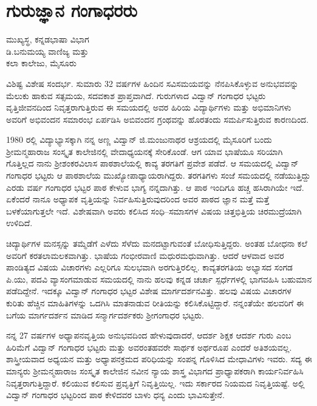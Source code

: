 {\fontsize{14}{16}\selectfont
\chapter{ಗುರುಜ್ಞಾನ ಗಂಗಾಧರರು}

\begin{center}
\smallskip
 ಮುಖ್ಯಸ್ಥ, ಕನ್ನಡಭಾಷಾ ವಿಭಾಗ\\
ಡಿ.ಬನುಮಯ್ಯ ವಾಣಿಜ್ಯ ಮತ್ತು \\
ಕಲಾ ಕಾಲೇಜು, ಮೈಸೂರು
\addrule
\end{center}

ವಿಶಿಷ್ಟ ವಿಶೇಷ ಸಂದರ್ಭ. ಸುಮಾರು 32 ವರ್ಷಗಳ ಹಿಂದಿನ ಸವಿಸಮಯವನ್ನು ನೆನಪಿಸಿಕೊಳ್ಳುವ ಅನುಭವವನ್ನು ಮೆಲುಕು ಹಾಕುವ ಸತ್ಸಮಯ, ಸದವಕಾಶ ಪ್ರಾಪ್ತವಾಗಿದೆ. ಗುರುಗಳಾದ ವಿದ್ವಾನ್ ಗಂಗಾಧರ ಭಟ್ಟರು ವೃತ್ತಿಜೀವನದಿಂದ ನಿವೃತ್ತರಾಗುತ್ತಿರುವ ಈ ಸಮಯದಲ್ಲಿ ಅವರ ಹಿರಿಯ ವಿದ್ಯಾರ್ಥಿಗಳು ಮತ್ತು ಅಭಿಮಾನಿಗಳು ಅವರಿಗೆ ಅಭಿವಂದನ ಸಮಾರಂಭ ಏರ್ಪಡಿಸಿ ಅಬಿವಂದನ ಗ್ರಂಥವನ್ನು ಹೊರತಂದು ಸಮರ್ಪಿಸುತ್ತಿರುವ ಕಾರಣದಿಂದ.

1980 ರಲ್ಲಿ ವಿದ್ಯಾಭ್ಯಾಸಕ್ಕಾಗಿ ನನ್ನ ಅಣ್ಣ ವಿದ್ವಾನ್ ಜಿ.ಮಂಜುನಾಥರ ಆಶ್ರಯದಲ್ಲಿ ಮೈಸೂರಿಗೆ ಬಂದು ಶ್ರೀಮನ್ಮಹಾರಾಜ ಸಂಸ್ಕೃತ ಕಾಲೇಜಿನಲ್ಲಿ ವೇದಾಧ್ಯಯನಕ್ಕೆ ಸೇರಿಕೊಂಡೆ. ಆಗ ಯಾವ ಭಾಷೆಯೂ ಸರಿಯಾಗಿ ಗೊತ್ತಿಲ್ಲದ ನಾನು ಶ್ರೀಶಂಕರವಿಲಾಸ ಪಾಠಶಾಲೆಯಲ್ಲಿ ಕಾವ್ಯ ತರಗತಿಗೆ ಪ್ರವೇಶ ಪಡೆದೆ. ಆ ಸಮಯದಲ್ಲಿ ವಿದ್ವಾನ್ ಗಂಗಾಧರ ಭಟ್ಟರು ಆ ಪಾಠಶಾಲೆಯ ಮುಖ್ಯೋಪಾಧ್ಯಾಯರಾಗಿದ್ದರು. ತರಗತಿಗಳು ಸಂಜೆ ಸಮಯದಲ್ಲಿ ನಡೆಯುತ್ತಿದ್ದು ಎರಡು ವರ್ಷ ಗಂಗಾಧರ ಭಟ್ಟರ ಪಾಠ ಕೇಳುವ ಭಾಗ್ಯ ನನ್ನದಾಗಿತ್ತು. ಆ ಪಾಠ ಇಂದಿಗೂ ಹಚ್ಚ ಹಸಿರಾಗಿಯೇ ಇದೆ. ಏಕೆಂದರೆ ನಾನೂ ಅಧ್ಯಾಪಕ ವೃತ್ತಿಯನ್ನು ನಿರ್ವಹಿಸುತ್ತಿರುವುದರಿಂದ ಅವರ ಪಾಠದ ಜ್ಞಾನ ಮತ್ತೆ ಮತ್ತೆ ಬಳಕೆಯಾಗುತ್ತಲೇ ಇದೆ. ವಿಶೇಷವಾಗಿ ಅವರು ಕಲಿಸಿದ ಸಂಧಿ–ಸಮಾಸಗಳ ವಿಷಯ ಚಿತ್ತಭಿತ್ತಿಯ ಚಿರಮುದ್ರೆಯಾಗಿ ಉಳಿದಿದೆ. 

ಚಿದ್ಯಾರ್ಥಿಗಳ ಮನಸ್ಸನ್ನು ತಮ್ಮೆಡೆಗೆ ಎಳೆದು ಸೆಳೆದು ಮನದಟ್ಟಾಗುವಂತೆ ಬೋಧಿಸುತ್ತಿದ್ದರು. ಅಂತಹ ಬೋಧನಾ ಕಲೆ ಅವರಿಗೆ ಕರತಲಾಮಲಕವಾಗಿತ್ತು. ಭಾಷೆಯ ಗಂಭೀರವಾಣಿ ಮಧುರಮಧುವಾಗಿತ್ತು. ಆದರೆ ಆಳವಾದ ಅವರ ಪಾಂಡಿತ್ಯದ ವಿಷಯ ವಿಚಾರಗಳು ಎಲ್ಲರಿಗೂ ಸುಲಭವಾಗಿ ಅರಗುತ್ತಿರಲಿಲ್ಲ. ಕಾವ್ಯತರಗತಿಯ ಅಭ್ಯಾಸದ ಸಂಗಡ ಪಿ.ಯು, ಪದವಿ ವ್ಯಾಸಂಗಮಾಡುವ ಸಮಯದಲ್ಲಿ ನಾನು ಹಲವು ಕನ್ನಡ ಚರ್ಚಾ ಸ್ಪರ್ಧೆಗಳಲ್ಲಿ ಭಾಗವಹಿಸಿ ಬಹುಮಾನ ಪಡೆದಿದ್ದೇನೆ. ಇದಕ್ಕೂ ವಿದ್ವಾನ್ ಗಂಗಾಧರ ಭಟ್ಟರ ವಿಶೇಷ ಮಾರ್ಗದರ್ಶನವಿತ್ತು. ಹಲವು ವಿಷಯ ವಿಚಾರಗಳ ಕುರಿತು ಹೆಚ್ಚಿನ ಮಾಹಿತಿಗಳನ್ನು ಒದಗಿಸಿ ಮಾತನಾಡುವ ರೀತಿಯನ್ನು ಕಲಿಸಿಕೊಟ್ಟಿದ್ದಾರೆ. ನನ್ನಂತೆಯೇ ಹಲವರಿಗೆ ಈ ಬಗೆಯ ಮಾರ್ಗದರ್ಶನ ಮಾಡಿದ ಸನ್ಮಾರ್ಗದರ್ಶಕರು ಶ್ರೀಗಂಗಾಧರ ಭಟ್ಟರು. 

ನನ್ನ 27 ವರ್ಷಗಳ ಅಧ್ಯಾಪನವೃತ್ತಿಯ ಅನುಭವದಿಂದ ಹೇಳುವುದಾದರೆ, ಆದರ್ಶ ಶಿಕ್ಷಕ ಆದರ್ಶ ಗುರು ಎಂಬ ಹಿರಿಮೆಗೆ ವಿದ್ವಾನ್ ಗಂಗಾಧರ ಭಟ್ಟರು ಮತ್ತು ಅವರಂತಹವರೇ ಸಾರ್ಥಕ ಅರ್ಥರೂಪ ಎಂದರೆ ಅತಿಶಯವಲ್ಲ. ಶಾಸ್ತ್ರೀಯವಾದ ಅಧ್ಯಯನ ಮತ್ತು ಅಧ್ಯಾಪನಕ್ರಮದ ಪರಿಧಿಯನ್ನು ಸಂಪನ್ನ ಗೊಳಿಸಿದ ಮೇಧಾವಿಗಳು ಇವರು. ಸದ್ಯ ಈ ಮಾನ್ಯರು ಶ್ರೀಮನ್ಮಹಾರಾಜ ಸಂಸ್ಕೃತ ಕಾಲೇಜಿನ ನವೀನ ನ್ಯಾಯ ಶಾಸ್ತ್ರ ವಿಭಾಗದ ಪ್ರಾಧ್ಯಾಪಕರಾಗಿ ಕಾರ್ಯನಿರ್ವಹಿಸಿ ನಿವೃತ್ತರಾಗುತ್ತಿದ್ದಾರೆ. ಕಲಿಯುವ ಕಲಿಸುವ ಪ್ರವೃತ್ತಿಗೆ ನಿವೃತ್ತಿಯಿಲ್ಲ. ಇದು ಸರ್ಕಾರದ ನಿಯಮದ ನಿವೃತ್ತಿಯಷ್ಟೆ. ಅಲ್ಲಿ ವಿದ್ವಾನ್ ಗಂಗಾಧರ ಭಟ್ಟರಿಂದ ಪಾಠ ಕೇಳಿದವರ ಬಾಳು ಧನ್ಯ ಎಂದು ಭಾವಿಸುತ್ತೇನೆ.

}
